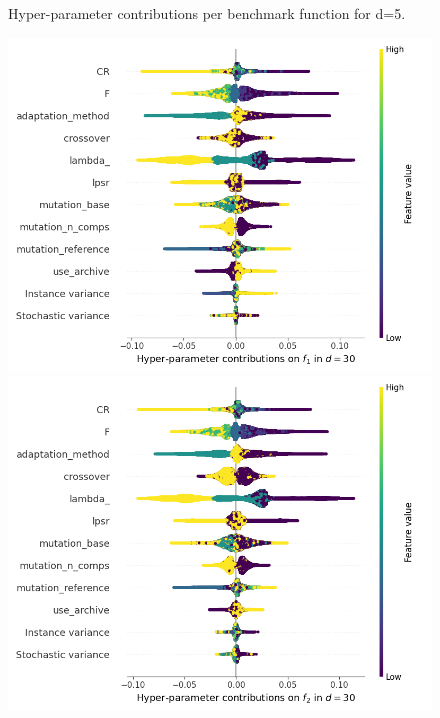 \begin{figure}[t]
\caption{Hyper-parameter contributions per benchmark function for d=5. \label{fig:shapxplaind5}}

\end{figure}

\begin{figure}[t]
\centering
	\includegraphics[height=0.15\textheight,trim=0mm 0mm 30mm 0mm,clip]{de_img_new/img_summary_f1_d30.png}
	\includegraphics[height=0.15\textheight,trim=60mm 0mm 30mm 0mm,clip]{de_img_new/img_summary_f2_d30.png}

\end{figure}
